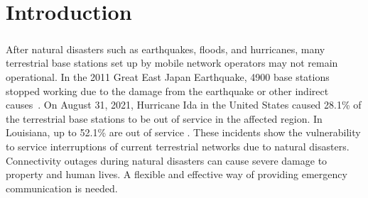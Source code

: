 \documentclass[a4paper,12pt]{report}
\begin{document}
\chapter{Introduction}
\paragraph{}
After natural disasters such as earthquakes, floods, and hurricanes, many terrestrial base stations set up by mobile network operators may not remain operational. In the 2011 Great East Japan Earthquake, 4900 base stations stopped working due to the damage from the earthquake or other indirect causes~\cite{b1}. On August 31, 2021, Hurricane Ida in the United States caused 28.1\% of the terrestrial base stations to be out of service in the affected region. In Louisiana, up to 52.1\% are out of service \cite{b2}. These incidents show the vulnerability to service interruptions of current terrestrial networks due to natural disasters. Connectivity outages during natural disasters can cause severe damage to property and human lives. A flexible and effective way of providing emergency communication is needed.
\end{document}
